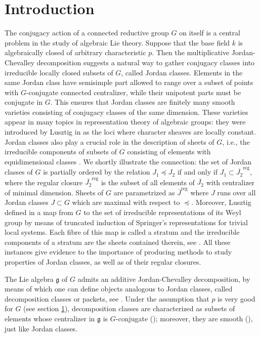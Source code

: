 \documentclass[12pt]{amsart}
\theoremstyle{definition}
\theoremstyle{remark}
\newcommand{\g}{\mathfrak{g}}
\newcommand{\reg}{{\operatorname{reg}}}
\begin{document}
\section{Introduction} \label{s_intro}
The conjugacy action of a connected reductive group $G$ on itself is a central problem in the study of algebraic Lie theory.
Suppose that the base field $k$ is algebraically closed of arbitrary characteristic $p$.
Then the multiplicative Jordan-Chevalley decomposition suggests a natural way to gather conjugacy classes into irreducible locally closed subsets of $G$, called  Jordan classes.
Elements in the same Jordan class have semisimple part  allowed to range over a subset of points with $G$-conjugate connected centralizer, while their unipotent parts must be conjugate in $G$.
This ensures that Jordan classes are finitely many smooth varieties consisting of conjugacy classes of the same dimension.
These varieties appear in many topics in representation theory of algebraic groups: they were introduced by Lusztig in \cite{LusztigICC} as the loci where character sheaves are locally constant.
Jordan classes also play a crucial role in the description of sheets of $G$, i.e., the irreducible components of subsets of $G$ consisting of elements with equidimensional classes \cite{ACE, ACEbad}.
We shortly illustrate the connection: the set of Jordan classes of $G$ is partially ordered by the relation $J_1 \preceq J_2$ if and only if $J_1 \subset \overline{J_2}^\reg$, where the regular closure $\overline{J_2}^\reg$ is the subset of all elements of $\overline{J_2}$ with centralizer of minimal dimension.
Sheets of $G$ are parametrized as $\overline{J}^\reg$ where $J$ runs over all Jordan classes $J \subset G$ which are maximal with respect to $\preceq$.
Moreover, Lusztig defined in \cite{LusztigCCRG} a map from $G$ to the set of irreducible representations of its Weyl group by means of truncated induction of Springer's representations for trivial local systems.
Each fibre of this map is called a stratum and the irreducible components  of a stratum are the sheets contained therein, see \cite{CarnoBul}.
All these instances give evidence to the importance of producing methods to study properties of Jordan classes, as well as of their regular closures.

The Lie algebra $\g$ of $G$ admits an additive Jordan-Chevalley decomposition, by means of which one can define objects analogous to Jordan classes, called decomposition classes or packets, see \cite{BK79, BroerDecoVar, BroerLectures, PremSt, Sp_bad}. 
Under the assumption that $p$ is very good for $G$ (see section \ref{s_intro}), decomposition classes are characterized as subsets of elements whose centralizer in $\g$ is $G$-conjugate (\cite[Theorem 3.7.1]{BroerLectures}); moreover, they are smooth (\cite[Corollary 3.8.1]{BroerLectures}), just like Jordan classes.
\end{document}
